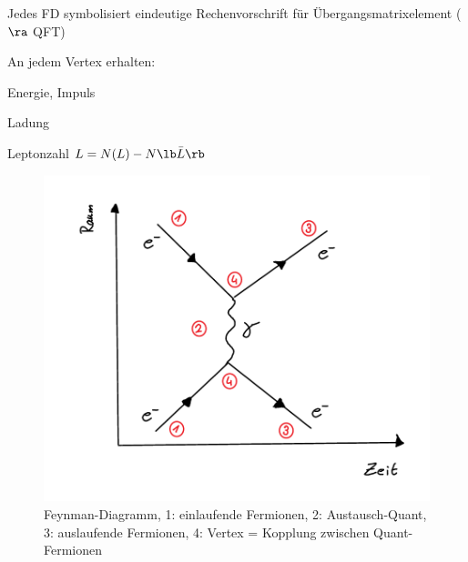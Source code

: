 \begin{compactitem}
\item Jedes FD symbolisiert eindeutige Rechenvorschrift für Übergangsmatrixelement ($\ra$ QFT)
\item An jedem Vertex erhalten:
\begin{compactitem}
\item Energie, Impuls
\item Ladung
\item Leptonzahl $L = N(L) - N\lb \bar{L}\rb $
\end{compactitem}
\end{compactitem}
\begin{figure}[!ht]
\centering
\includegraphics[width=.5\textwidth]{imgs/ep5-fig-2-2.pdf}
\caption{Feynman-Diagramm, 1: einlaufende Fermionen, 2: Austausch-Quant, 3: auslaufende Fermionen, 4: Vertex = Kopplung zwischen Quant-Fermionen\label{fig:2.2}}
\end{figure}

